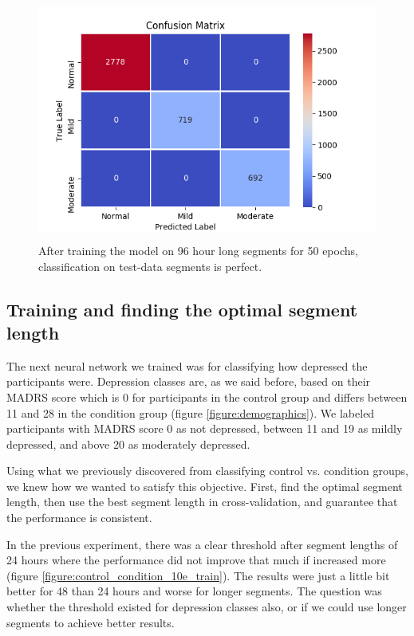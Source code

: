 \begin{figure}
\begin{center}
      \includegraphics[height=8cm]{img/depression_class/conf_5760_60_50_32.png}
      \caption{After training the model on 96 hour long segments for 50 epochs, classification on test-data segments is perfect.}
      \label{figure:depression_class_confusion_matrix_96h}
\end{center}
\end{figure}

\subsection{Training and finding the optimal segment length}

The next neural network we trained was for classifying how depressed the participants were. Depression classes are, as we said before, 
based on their MADRS score which is 0 for participants in the control group and differs between 11 and 28 in the condition group (figure \ref{figure:demographics}). We labeled participants with MADRS score 0 as not depressed, between 11 and 19 as mildly depressed, and above 20 as moderately depressed. 

Using what we previously discovered from classifying control vs. condition groups, we knew how we wanted to satisfy this objective. First, find the optimal segment length, then use the best segment length in cross-validation, and guarantee that the performance is consistent. 

In the previous experiment, there was a clear threshold after segment lengths of 24 hours where the performance did not improve that much if increased more (figure \ref{figure:control_condition_10e_train}). The results were just a little bit better for 48 than 24 hours and worse for longer segments. The question was whether the threshold existed for depression classes also, or if we could use longer segments to achieve better results.


